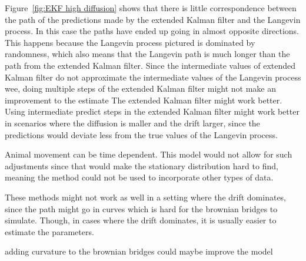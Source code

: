 Figure~\ref{fig:EKF high diffusion} shows that there is little correspondence between the path of the predictions made by the extended Kalman filter and the Langevin process. In this case the paths have ended up going in almost opposite directions. This happens because the Langevin process pictured is dominated by randomness, which also means that the Langevin path is much longer than the path from the extended Kalman filter. Since the intermediate values of extended Kalman filter do not approximate the intermediate values of the Langevin process wee, doing multiple steps of the extended Kalman filter might not make an improvement to the estimate
The extended Kalman filter might work better. Using intermediate predict steps in the extended Kalman filter might work better in scenarios where the diffusion is maller and the drift larger, since the predictions would deviate less from the true values of the Langevin process.





































Animal movement can be time dependent. This model would not allow for such adjustments since that would make the stationary distribution hard to find, meaning the method could not be used to incorporate other types of data.



These methods might not work as well in a setting where the drift dominates, since the path might go in curves which is hard for the brownian bridges to simulate. Though, in cases where the drift dominates, it is usually easier to estimate the parameters.


adding curvature to the brownian bridges could maybe improve the model


